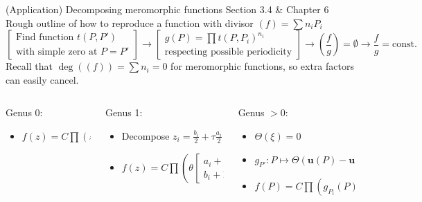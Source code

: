 \documentclass[11pt,aspectratio=169]{beamer}
\begin{document}
\begin{frame}{(Application) Decomposing meromorphic functions}{\tiny \cite{Cha22} Section 3.4 \& \cite{Ber06} Chapter 6}
    Rough outline of how to reproduce a function with divisor $(f) = \sum n_i P_i$
    \[ \begin{bmatrix}\text{Find function }t(P,P') \\ \text{with simple zero at }P=P'\end{bmatrix} \rightarrow \begin{bmatrix} g(P)=\prod t(P,P_i)^{n_i} \\ \text{respecting possible periodicity}\end{bmatrix} \rightarrow \left(\frac{f}{g}\right) = \emptyset \rightarrow \frac{f}{g} = \text{const.} \]
    Recall that $\deg((f)) = \sum n_i = 0$ for meromorphic functions, so extra factors can easily cancel.
    
    
    \vspace{+1em}
    \begin{columns}[t]
        \begin{column}{0.3\textwidth}
            Genus 0:
            \begin{itemize}
                \item $f(z) = C \prod (z-z_i)^{n_i}$
            \end{itemize}
        \end{column}


        \begin{column}{0.35\textwidth}
            Genus 1:
            \begin{itemize}
                \item Decompose $z_i = \frac{b_i}{2} + \tau \frac{a_i}{2}$
                \item $f(z) = C \prod \left(\theta\begin{bmatrix}a_i+1 \\ b_i+1\end{bmatrix}(z)\right)^{n_i}$
            \end{itemize}
        \end{column}


        \begin{column}{0.3\textwidth}
            Genus $>0$:
            \begin{itemize}
                \item $\Theta(\xi) = 0$
                \item $g_{P'} : P \mapsto \Theta(\mathbf{u}(P)-\mathbf{u}(P')+\xi)$
                \item $f(P) = C \prod \left(g_{P_i}(P)\right)^{n_i}$
            \end{itemize}
        \end{column}
    \end{columns}
\end{frame}
\end{document}
